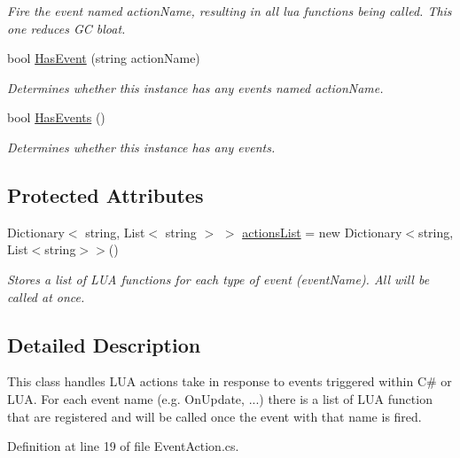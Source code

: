 \begin{DoxyCompactItemize}
\begin{DoxyCompactList}\small\item\em Fire the event named action\+Name, resulting in all lua functions being called. This one reduces GC bloat. \end{DoxyCompactList}\item 
bool \hyperlink{class_event_actions_a042920ebed150392f68e1d110b9c8d1d}{Has\+Event} (string action\+Name)
\begin{DoxyCompactList}\small\item\em Determines whether this instance has any events named action\+Name. \end{DoxyCompactList}\item 
bool \hyperlink{class_event_actions_a356450553da17ec832729bbe14757c8c}{Has\+Events} ()
\begin{DoxyCompactList}\small\item\em Determines whether this instance has any events. \end{DoxyCompactList}\end{DoxyCompactItemize}
\subsection*{Protected Attributes}
\begin{DoxyCompactItemize}
\item 
Dictionary$<$ string, List$<$ string $>$ $>$ \hyperlink{class_event_actions_a70ac038ce2e3cabfa1dfb6f7706154b6}{actions\+List} = new Dictionary$<$string, List$<$string$>$$>$()
\begin{DoxyCompactList}\small\item\em Stores a list of L\+UA functions for each type of event (event\+Name). All will be called at once. \end{DoxyCompactList}\end{DoxyCompactItemize}


\subsection{Detailed Description}
This class handles L\+UA actions take in response to events triggered within C\# or L\+UA. For each event name (e.\+g. On\+Update, ...) there is a list of L\+UA function that are registered and will be called once the event with that name is fired. 



Definition at line 19 of file Event\+Action.\+cs.



